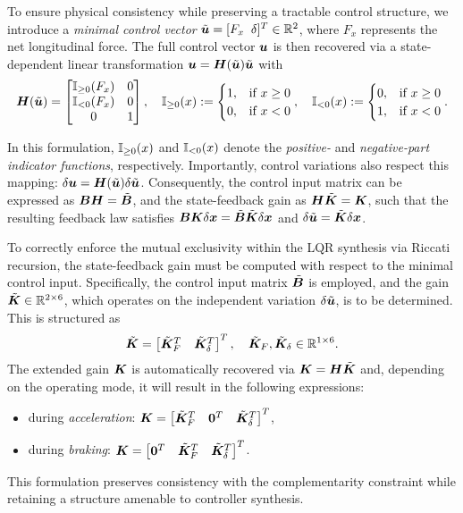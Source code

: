 To ensure physical consistency while preserving a tractable control structure, we introduce a \emph{minimal control vector} \(\tilde{\boldsymbol{u}} = [F_x\;\; \delta]^T \in \mathbb{R}^2\), where \(F_x\) represents the net longitudinal force. The full control vector $\boldsymbol{u}$ is then recovered via a state-dependent linear transformation $
\boldsymbol{u} = \boldsymbol{H}(\tilde{\boldsymbol{u}}) \tilde{\boldsymbol{u}}$ with
\begin{equation} \label{eq:minimalcontrol}
\bH(\tilde{\bu}) =
\begin{bmatrix}
\Ipos{F_x} & 0 \\
\Ineg{F_x} & 0 \\
0 & 1
\end{bmatrix}, \quad
\Ipos{x} :=
\begin{cases}
1, & \text{if } x \geq 0 \\
0, & \text{if } x < 0
\end{cases}, \quad
\Ineg{x} :=
\begin{cases}
0, & \text{if } x \geq 0 \\
1, & \text{if } x < 0
\end{cases}.
\end{equation}

In this formulation, \(\mathbb{I}_{\geq 0}(x)\) and \(\mathbb{I}_{< 0}(x)\) denote the \emph{positive-} and \emph{negative-part indicator functions}, respectively. Importantly, control variations also respect this mapping: $\delta\boldsymbol{u} = \boldsymbol{H}(\tilde{\boldsymbol{u}}) \delta\tilde{\boldsymbol{u}}$. Consequently, the control input matrix can be expressed as \(\boldsymbol{B} \boldsymbol{H} = \tilde{\boldsymbol{B}}\), and the state-feedback gain as \(\boldsymbol{H} \tilde{\boldsymbol{K}} = \boldsymbol{K}\), such that the resulting feedback law satisfies \(\boldsymbol{B} \boldsymbol{K} \delta\boldsymbol{x} = \tilde{\boldsymbol{B}} \tilde{\boldsymbol{K}} \delta\boldsymbol{x}\) and $\delta \tilde{\boldsymbol{u}} = \tilde{\boldsymbol{K}} \delta \boldsymbol{x}$.

To correctly enforce the mutual exclusivity within the LQR synthesis via Riccati recursion, the state-feedback gain must be computed with respect to the minimal control input. Specifically, the control input matrix $\tilde{\boldsymbol{B}}$ is employed, and the gain $\tilde{\boldsymbol{K}} \in \mathbb{R}^{2 \times 6}$, which operates on the independent variation \(\delta\tilde{\boldsymbol{u}}\), is to be determined. This is structured as
\[
\tilde{\boldsymbol{K}} = \begin{bmatrix} \tilde{\boldsymbol{K}}_F^T & \tilde{\boldsymbol{K}}_\delta^T \end{bmatrix}^T, \quad \tilde{\boldsymbol{K}}_F, \tilde{\boldsymbol{K}}_\delta \in \mathbb{R}^{1 \times 6}.
\]
The extended gain $\boldsymbol{K}$ is automatically recovered via $\boldsymbol{K} = \boldsymbol{H} \tilde{\boldsymbol{K}}$ and, depending on the operating mode, it will result in the following expressions:
\begin{itemize}
  \item during \emph{acceleration}: \(\boldsymbol{K} = \begin{bmatrix} \tilde{\boldsymbol{K}}_F^T & \mathbf{0}^T & \tilde{\boldsymbol{K}}_\delta^T \end{bmatrix}^T\),
  \item during \emph{braking}: \(\boldsymbol{K} = \begin{bmatrix} \mathbf{0}^T & \tilde{\boldsymbol{K}}_F^T & \tilde{\boldsymbol{K}}_\delta^T \end{bmatrix}^T\).
\end{itemize}
This formulation preserves consistency with the complementarity constraint while retaining a structure amenable to controller synthesis.

